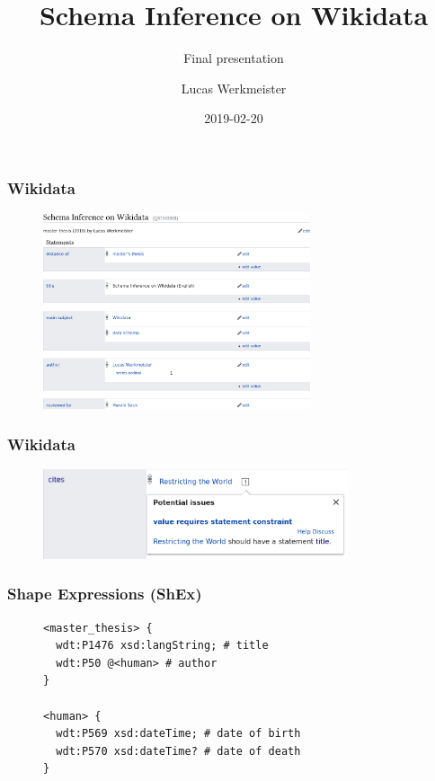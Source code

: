 \documentclass[aspectratio=169]{beamer}
\title{Schema Inference on Wikidata}
\subtitle{Final presentation}
\author{Lucas Werkmeister}
\date{2019-02-20}
\begin{document}
\frame{\titlepage}

\begin{frame}
  \frametitle{Wikidata}
  \begin{figure}
    \includegraphics[width=0.7\textwidth]{item}
  \end{figure}
\end{frame}

\begin{frame}
  \frametitle{Wikidata}
  \begin{figure}
    \includegraphics[width=0.8\textwidth]{constraint}
  \end{figure}
\end{frame}

\begin{frame}[fragile]
  \frametitle{Shape Expressions (ShEx)}
  \begin{figure}
    \begin{lstlisting}[language=sparql]
<master_thesis> {
  wdt:P1476 xsd:langString; # title
  wdt:P50 @<human> # author
}

<human> {
  wdt:P569 xsd:dateTime; # date of birth
  wdt:P570 xsd:dateTime? # date of death
}
    \end{lstlisting}
  \end{figure}
\end{frame}
\end{document}
